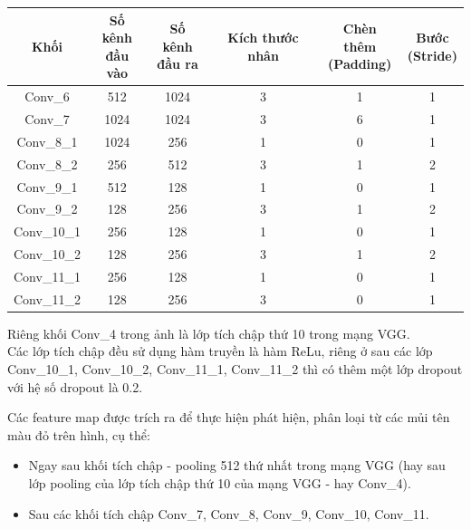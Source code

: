 \documentclass[a4paper,12pt]{article}
\begin{document}
	\begin{center}
		\begin{tabular}{||c | c | c | c | c | c ||} 
			\hline
			Khối & \makecell{ Số kênh \\ đầu vào } & \makecell{ Số kênh \\ đầu ra} & Kích thước nhân &  \makecell{ Chèn thêm \\ (Padding) } &  \makecell{ Bước \\ (Stride) } \\ [0.5ex] 
			\hline\hline
			Conv\_6 & 512 & 1024 & 3 & 1 & 1 \\ 
			\hline
			Conv\_7 & 1024 & 1024 & 3 & 6 & 1 \\ 
			\hline
			Conv\_8\_1 & 1024 & 256 & 1 & 0 & 1 \\ 
			\hline
			Conv\_8\_2 & 256 & 512 & 3 & 1 & 2 \\ 
			\hline
			Conv\_9\_1 & 512 & 128 & 1 & 0 & 1 \\ 
			\hline
			Conv\_9\_2 & 128 & 256 & 3 & 1 & 2 \\ 
			\hline
			Conv\_10\_1 & 256 & 128 & 1 & 0 & 1 \\ 
			\hline
			Conv\_10\_2 & 128 & 256 & 3 & 1 & 2 \\ 
			\hline
			Conv\_11\_1 & 256 & 128 & 1 & 0 & 1 \\ 
			\hline
			Conv\_11\_2 & 128 & 256 & 3 & 0 & 1 \\ 
			\hline
		\end{tabular}
	\end{center}
	
	Riêng khối Conv\_4 trong ảnh là lớp tích chập thứ 10 trong mạng VGG\cite{simonyan2014very}.\\
	
	Các lớp tích chập đều sử dụng hàm truyền là hàm ReLu, riêng ở sau các lớp Conv\_10\_1, Conv\_10\_2, Conv\_11\_1, Conv\_11\_2 thì có thêm một lớp dropout\cite{srivastava2014dropout} với hệ số dropout là 0.2.
	
	Các feature map được trích ra để thực hiện phát hiện, phân loại từ các mủi tên màu đỏ trên hình, cụ thể:
	
	\begin{itemize}
		\item Ngay sau khối tích chập - pooling 512 thứ nhất trong mạng VGG\cite{simonyan2014very} (hay sau lớp pooling của lớp tích chập thứ 10 của mạng VGG\cite{simonyan2014very} - hay Conv\_4).
		\item Sau các khối tích chập Conv\_7, Conv\_8, Conv\_9, Conv\_10, Conv\_11.
	\end{itemize}
	
\end{document}
